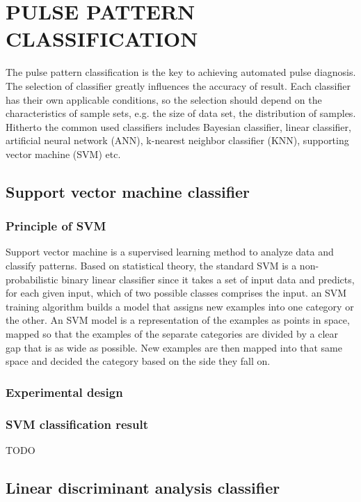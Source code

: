 \chapter[Pulse pattern classification]{\uppercase{Pulse Pattern Classification}}
\label{chap:five}

The pulse pattern classification is the key to achieving automated
pulse diagnosis. The selection of classifier greatly influences the
accuracy of result. Each classifier has their own applicable
conditions, so the selection should depend on the characteristics of
sample sets, e.g. the size of data set, the distribution of
samples. Hitherto the common used classifiers includes Bayesian
classifier, linear classifier, artificial neural network (ANN), k-nearest
neighbor classifier (KNN), supporting vector machine (SVM) etc. 

\section{Support vector machine classifier}

\subsection{Principle of SVM}
Support vector machine is a supervised learning method to analyze
data and classify patterns. Based on statistical theory, the standard SVM 
is a non-probabilistic binary linear classifier since it takes a set
of input data and predicts, for each given input, which of two
possible classes comprises the input.
an SVM training algorithm builds a model
that assigns new examples into one category or the other. An SVM model
is a representation of the examples as points in space, mapped so that
the examples of the separate categories are divided by a clear gap
that is as wide as possible. New examples are then mapped into that
same space and decided the category based on the side they fall on.

\subsection{Experimental design}
\subsection{SVM classification result}

TODO

\section{Linear discriminant analysis classifier}

